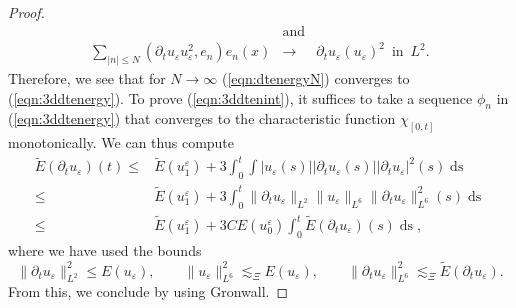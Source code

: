 \documentclass[11pt, oneside]{article}   	%
\newcommand{\tmop}[1]{\ensuremath{\operatorname{#1}}}
\begin{document}
\begin{proof}
\begin{eqnarray*}
		& \tmop{and} & \\
		\underset{| n | \le N}{\sum} (\partial_t u_{\varepsilon}
		u^2_{\varepsilon}, e_n) e_n (x) & \rightarrow & \partial_t u_{\varepsilon}
		(u_{\varepsilon})^2
		 \ \tmop{in} \ L^2.
	\end{eqnarray*}
	Therefore,  we see that for $N \rightarrow \infty$ (\ref{eqn:dtenergyN}) converges
	to (\ref{eqn:3ddtenergy}).
	To prove (\ref{eqn:3ddtenint}), it suffices to take a sequence $\phi_n$ in
	(\ref{eqn:3ddtenergy}) that converges to the characteristic function
	$\chi_{[0, t]}$ monotonically.	
	We can thus compute
	\begin{align*}
	\tilde{E} (\partial_t u_{\varepsilon}) (t)  \le & \tilde{E}
	(u_1^{\varepsilon}) + 3
	\int_{0}^{t} \int |
		u_{\varepsilon} (s) | | \partial_t u_{\varepsilon} (s) | | \partial_t
		u_{\varepsilon} |^2 (s) \tmop{ds}\\
	\le & \tilde{E} (u_1^{\varepsilon}) + 3
	\int_{0}^{t} \| \partial_t u_{\varepsilon} \|_{L^2} \|
	u_{\varepsilon} \|_{L^6} \| \partial_t u_{\varepsilon} \|^2_{L^6} (s)
	\tmop{ds}\\
	\le & \tilde{E} (u_1^{\varepsilon}) + 3 CE
	(u_0^{\varepsilon}) \int_{0}^{t} \tilde{E}
		(\partial_t u_{\varepsilon}) (s) \tmop{ds},
	\end{align*}
	where we have used the bounds
	\begin{equation*}
	\| \partial_t u_{\varepsilon} \|^2_{L^2} \le E (u_{\varepsilon}), \qquad
	\| u_{\varepsilon} \|^2_{L^6} 
	 \lesssim_\Xi E (u_{\varepsilon}), \qquad
	 \| \partial_t u_{\varepsilon}
	\|^2_{L^6} \lesssim_\Xi
	\tilde{E} (\partial_t u_{\varepsilon}) . 
	\end{equation*}
	From this, we conclude by using Gronwall. 
\end{proof}
\end{document}
